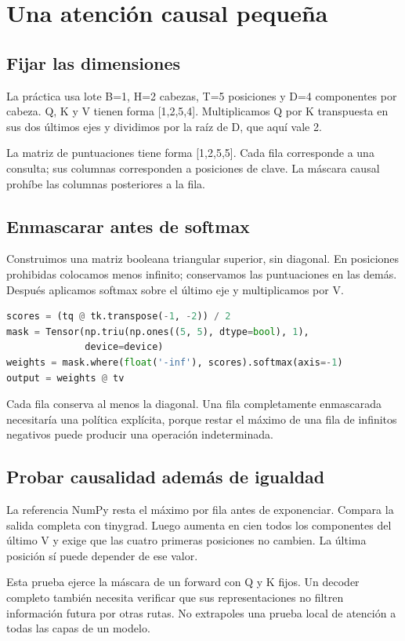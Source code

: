 \documentclass[12pt,a4paper,oneside]{report}
\begin{document}
\chapter{Una atención causal pequeña}
\section{Fijar las dimensiones}
La práctica usa lote B=1, H=2 cabezas, T=5 posiciones y D=4 componentes por cabeza. Q, K y V tienen forma [1,2,5,4]. Multiplicamos Q por K transpuesta en sus dos últimos ejes y dividimos por la raíz de D, que aquí vale 2.

La matriz de puntuaciones tiene forma [1,2,5,5]. Cada fila corresponde a una consulta; sus columnas corresponden a posiciones de clave. La máscara causal prohíbe las columnas posteriores a la fila.

\section{Enmascarar antes de softmax}
Construimos una matriz booleana triangular superior, sin diagonal. En posiciones prohibidas colocamos menos infinito; conservamos las puntuaciones en las demás. Después aplicamos softmax sobre el último eje y multiplicamos por V.

\begin{lstlisting}[language=Python]
scores = (tq @ tk.transpose(-1, -2)) / 2
mask = Tensor(np.triu(np.ones((5, 5), dtype=bool), 1),
              device=device)
weights = mask.where(float('-inf'), scores).softmax(axis=-1)
output = weights @ tv
\end{lstlisting}
Cada fila conserva al menos la diagonal. Una fila completamente enmascarada necesitaría una política explícita, porque restar el máximo de una fila de infinitos negativos puede producir una operación indeterminada.

\section{Probar causalidad además de igualdad}
La referencia NumPy resta el máximo por fila antes de exponenciar. Compara la salida completa con tinygrad. Luego aumenta en cien todos los componentes del último V y exige que las cuatro primeras posiciones no cambien. La última posición sí puede depender de ese valor.

Esta prueba ejerce la máscara de un forward con Q y K fijos. Un decoder completo también necesita verificar que sus representaciones no filtren información futura por otras rutas. No extrapoles una prueba local de atención a todas las capas de un modelo.
\end{document}
